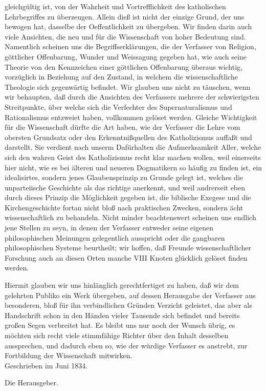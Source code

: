 gleichgültig ist, von der Wahrheit und Vortrefflichkeit des katholischen Lehrbegriffes zu überzeugen.
Allein dieß ist nicht der einzige Grund, der uns bewogen hat, dasselbe der Oeffentlichkeit zu übergeben. Wir finden darin auch viele Ansichten, die neu und für die Wissenschaft von hoher Bedeutung sind. Namentlich scheinen uns die Begriffserklärungen, die der Verfasser von Religion, göttlicher Offenbarung, Wunder und Weissagung gegeben hat, wie auch seine Theorie von den Kennzeichen einer göttlichen Offenbarung überaus wichtig, vorzüglich in Beziehung auf den Zustand, in welchem die wissenschaftliche Theologie sich gegenwärtig befindet. Wir glauben uns nicht zu täuschen, wenn wir behaupten, daß durch die Ansichten des Verfassers mehrere der schwierigsten Streitpunkte, über welche sich die Verfechter des Supernaturalismus und Rationalismus entzweiet haben, vollkommen gelöset werden. Gleiche Wichtigkeit für die Wissenschaft dürfte die Art haben, wie der Verfasser die Lehre vom obersten Grundsatz oder den Erkenntnißquellen des Katholizismus auffaßt und darstellt. Sie verdient nach unserm Dafürhalten die Aufmerksamkeit Aller, welche sich den wahren Geist des Katholizismus recht klar machen wollen, weil einerseits hier nicht, wie es bei älteren und neueren Dogmatikern so häufig zu finden ist, ein idealisirtes, sondern jenes Glaubensprinzip zu Grunde gelegt ist, welches die unparteiische Geschichte als das richtige anerkennt, und weil andrerseit eben durch dieses Prinzip die Möglichkeit gegeben ist, die biblische Exegese und die Kirchengeschichte fortan nicht bloß nach praktischen Zwecken, sondern ächt wissenschaftlich zu behandeln. Nicht minder beachtenswert scheinen uns endlich jene Stellen zu seyn, in denen der Verfasser entweder seine eigenen philosophischen Meinungen gelegentlich ausspricht oder die gangbaren philosophischen Systeme beurtheilt; wir hoffen, daß Freunde wissenschaftlicher Forschung auch an diesen Orten manche VIII Knoten glücklich gelöset finden werden.\par
Hiermit glauben wir uns hinlänglich gerechtfertiget zu haben, daß wir dem gelehrten Publiko ein Werk übergeben, auf dessen Herausgabe der Verfasser aus besonderen, bloß für ihn verbindlichen Gründen Verzicht geleistet, das aber als Handschrift schon in den Händen vieler Tausende sich befindet und bereits großen Segen verbreitet hat. Es bleibt uns nur noch der Wunsch übrig, es möchten sich recht viele stimmfähige Richter über den Inhalt desselben aussprechen, und dadurch eben so, wie der würdige Verfasser es anstrebt, zur Fortbildung der Wissenschaft mitwirken.\\[\baselineskip]
Geschrieben im Juni 1834.\par
Die Herausgeber.

\endinput